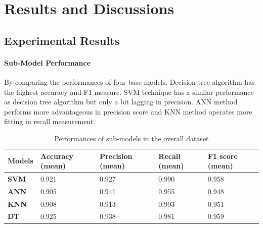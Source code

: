 \documentclass[runningheads]{llncs}
\begin{document}
\section{Results and Discussions}
%
%
\subsection{Experimental Results}
%
%
%
\paragraph{Sub-Model Performance}
%
By comparing the performances of four base models, Decision tree algorithm has the highest accuracy and F1 measure. SVM technique has a similar performance as decision tree algorithm but only a bit lagging in precision. ANN method performs more advantageous in precision score and KNN method operates more fitting in recall measurement. 
\begin{table}[h]
\begin{tabular}{|C{2cm}|C{2cm}|C{2cm}|C{2cm}|C{2cm}|}
\hline
{} 
{\color[HTML]{333333} \textbf{Models}} & {\color[HTML]{333333} \textbf{Accuracy (mean)}} & {\color[HTML]{333333} \textbf{Precision (mean)}} & {\color[HTML]{333333} \textbf{Recall (mean)}} & {\color[HTML]{333333} \textbf{F1 score (mean)}} \\ \hline
{} 
\textbf{SVM}  & 0.921  & 0.927 & 0.990  & 0.958  \\ \hline
{} 
\textbf{ANN} & 0.905 & 0.941 & 0.955 & 0.948 \\ \hline
{} 
\textbf{KNN}  & 0.908   & 0.913  & 0.993  & 0.951  \\ \hline
{} 
\textbf{DT} & 0.925  & 0.938 & 0.981  & 0.959  \\ \hline
\end{tabular}
\caption{Performances of sub-models in the overall dataset}
\label{submodels}
\end{table}
%
%
\end{document}
